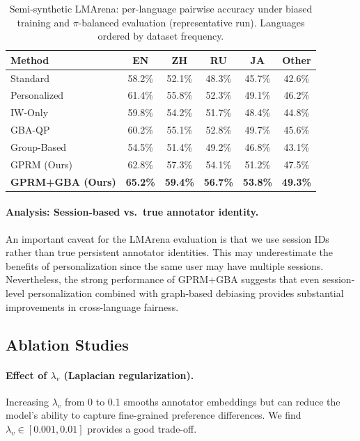 \documentclass{article}
\theoremstyle{plain}
\theoremstyle{definition}
\theoremstyle{remark}
\begin{document}
\begin{table}[h]
\caption{Semi-synthetic LMArena: per-language pairwise accuracy under biased training
and $\pi$-balanced evaluation (representative run). Languages ordered by dataset frequency.}
\label{tab:lmarena-extended}
\centering
\small
\begin{tabular}{lccccc}
\toprule
\textbf{Method} & \textbf{EN} & \textbf{ZH} & \textbf{RU} & \textbf{JA} & \textbf{Other} \\
\midrule
Standard & 58.2\% & 52.1\% & 48.3\% & 45.7\% & 42.6\% \\
Personalized & 61.4\% & 55.8\% & 52.3\% & 49.1\% & 46.2\% \\
IW-Only & 59.8\% & 54.2\% & 51.7\% & 48.4\% & 44.8\% \\
GBA-QP & 60.2\% & 55.1\% & 52.8\% & 49.7\% & 45.6\% \\
Group-Based & 54.5\% & 51.4\% & 49.2\% & 46.8\% & 43.1\% \\
GPRM (Ours) & 62.8\% & 57.3\% & 54.1\% & 51.2\% & 47.5\% \\
\textbf{GPRM+GBA (Ours)} & \textbf{65.2\%} & \textbf{59.4\%} & \textbf{56.7\%} & \textbf{53.8\%} & \textbf{49.3\%} \\
\bottomrule
\end{tabular}
\end{table}

\paragraph{Analysis: Session-based vs.\ true annotator identity.}
An important caveat for the LMArena evaluation is that we use session IDs rather than
true persistent annotator identities. This may underestimate the benefits of personalization
since the same user may have multiple sessions. Nevertheless, the strong performance of
GPRM+GBA suggests that even session-level personalization combined with graph-based
debiasing provides substantial improvements in cross-language fairness.

\subsection{Ablation Studies}
\label{app:ablations}

\paragraph{Effect of $\lambda_v$ (Laplacian regularization).}
Increasing $\lambda_v$ from 0 to 0.1 smooths annotator embeddings but can
reduce the model's ability to capture fine-grained preference differences.
We find $\lambda_v \in [0.001, 0.01]$ provides a good trade-off.
\end{document}
